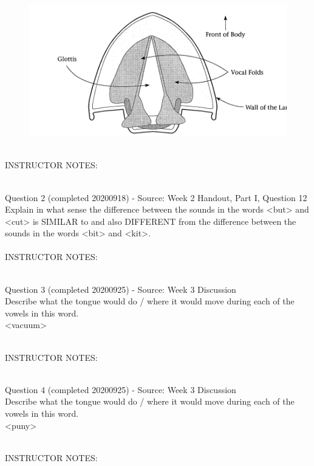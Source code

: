 \documentclass[12pt]{article}
\begin{document}
\begin{figure}[H]
\includegraphics{../images/spreadglottis_diagram.png}
\end{figure}

~\\
INSTRUCTOR NOTES: 


~\\

{\large Question 2} (completed 20200918) - Source: Week 2 Handout, Part I, Question 12\\

Explain in what sense the difference between the sounds in the words <but> and <cut> is SIMILAR to and also DIFFERENT from the difference between the sounds in the words <bit> and <kit>.\\


~\\
INSTRUCTOR NOTES: 


~\\

{\large Question 3} (completed 20200925) - Source: Week 3 Discussion\\

Describe what the tongue would do / where it would move during each of the vowels in this word.\\

<vacuum>


~\\
INSTRUCTOR NOTES: 


~\\

{\large Question 4} (completed 20200925) - Source: Week 3 Discussion\\

Describe what the tongue would do / where it would move during each of the vowels in this word.\\

<puny>


~\\
INSTRUCTOR NOTES: 
\end{document}
